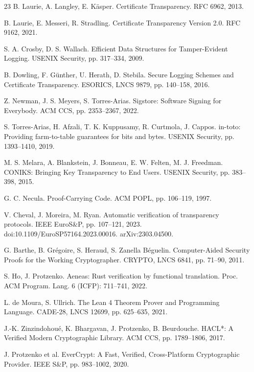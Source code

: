 \documentclass[11pt]{article}
\theoremstyle{remark}
\begin{document}
\begin{thebibliography}{23}
\itemsep2pt
 B. Laurie, A. Langley, E. K\"asper. Certificate Transparency.
RFC 6962, 2013.

 B. Laurie, E. Messeri, R. Stradling. Certificate Transparency
Version 2.0. RFC 9162, 2021.

 S. A. Crosby, D. S. Wallach. Efficient Data Structures for
Tamper-Evident Logging. USENIX Security, pp. 317--334, 2009.

 B. Dowling, F. G\"unther, U. Herath, D. Stebila. Secure
Logging Schemes and Certificate Transparency. ESORICS, LNCS 9879, pp.
140--158, 2016.

 Z. Newman, J. S. Meyers, S. Torres-Arias. Sigstore:
Software Signing for Everybody. ACM CCS, pp. 2353--2367, 2022.

 S. Torres-Arias, H. Afzali, T. K. Kuppusamy, R. Curtmola,
J. Cappos. in-toto: Providing farm-to-table guarantees for bits and bytes.
USENIX Security, pp. 1393--1410, 2019.

 M. S. Melara, A. Blankstein, J. Bonneau, E. W. Felten,
M. J. Freedman. CONIKS: Bringing Key Transparency to End Users. USENIX
Security, pp. 383--398, 2015.

 G. C. Necula. Proof-Carrying Code. ACM POPL, pp. 106--119,
1997.

 V. Cheval, J. Moreira, M. Ryan. Automatic verification of
transparency protocols. IEEE EuroS\&P, pp. 107--121, 2023.
doi:10.1109/EuroSP57164.2023.00016. arXiv:2303.04500.

 G. Barthe, B. Gr\'egoire, S. Heraud, S. Zanella
B\'eguelin. Computer-Aided Security Proofs for the Working Cryptographer.
CRYPTO, LNCS 6841, pp. 71--90, 2011.

 S. Ho, J. Protzenko. Aeneas: Rust verification by
functional translation. Proc. ACM Program. Lang. 6 (ICFP): 711--741, 2022.

 L. de Moura, S. Ullrich. The Lean 4 Theorem Prover and
Programming Language. CADE-28, LNCS 12699, pp. 625--635, 2021.

 J.-K. Zinzindohou\'e, K. Bhargavan, J. Protzenko,
B. Beurdouche. HACL*: A Verified Modern Cryptographic Library. ACM CCS,
pp. 1789--1806, 2017.

 J. Protzenko et al. EverCrypt: A Fast, Verified,
Cross-Platform Cryptographic Provider. IEEE S\&P, pp. 983--1002, 2020.


\end{thebibliography}
\end{document}
